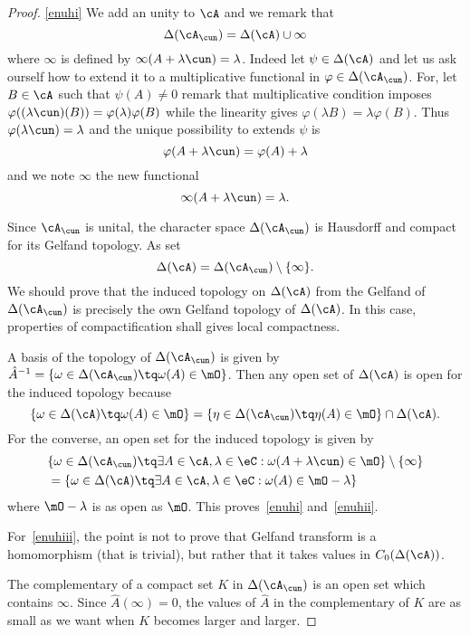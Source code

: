 \begin{proof}
\ref{enuhi} We add an unity to $\cA$ and we remark that
\[
\Delta(\cA_{\cun})=\Delta(\cA)\cup\infty
\]
where $\infty$ is defined by $\infty(A+\lambda\cun)=\lambda$. Indeed let $\psi\in\Delta(\cA)$ and let us ask ourself how to extend it to a multiplicative functional in $\varphi\in\Delta(\cA_{\cun})$. For, let $B\in\cA$ such that $\psi(A)\neq 0$ remark that multiplicative condition imposes $\varphi( (\lambda\cun)(B) )=\varphi(\lambda)\varphi(B)$ while the linearity gives $\varphi(\lambda B)=\lambda\varphi(B)$. Thus $\varphi(\lambda\cun)=\lambda$ and the unique possibility to extends $\psi$ is
\[
\varphi(A+\lambda\cun)=\varphi(A)+\lambda
\]
and we note $\infty$ the new functional
\[
\infty(A+\lambda\cun)=\lambda.
\]

Since $\cA_{\cun}$ is unital, the character space $\Delta(\cA_{\cun})$  is Hausdorff and compact for its Gelfand topology. As set
\[
  \Delta(\cA)=\Delta(\cA_{\cun})\setminus\{\infty\}.
\]
We should prove that the induced topology on $\Delta(\cA)$ from the Gelfand of $\Delta(\cA_{\cun})$ is precisely the own Gelfand topology of $\Delta(\cA)$. In this case, properties of compactification shall gives local compactness.

A basis of the topology of $\Delta(\cA_{\cun})$ is given by $\hat A^{-1}=\{\omega\in\Delta(\cA_{\cun})\tq\omega(A)\in\mO\}$. Then any open set of $\Delta(\cA)$ is open for the induced topology because
\[
\{\omega\in\Delta(\cA)\tq\omega(A)\in\mO\}=\{\eta\in\Delta(\cA_{\cun})\tq\eta(A)\in\mO\}\cap\Delta(\cA).
\]
For the converse, an open set for the induced topology is given by
\[
\begin{split}
&\{\omega\in\Delta(\cA_{\cun})\tq\exists A\in\cA,\lambda\in\eC:\omega(A+\lambda\cun)\in\mO\}\setminus\{\infty\}\\
&=\{\omega\in\Delta(\cA)\tq\exists A\in\cA,\lambda\in\eC:\omega(A)\in\mO-\lambda\}
\end{split}
\]
where $\mO-\lambda$ is as open as $\mO$. This proves~\ref{enuhi} and~\ref{enuhii}.

For~\ref{enuhiii}, the point is not to prove that Gelfand transform is a homomorphism (that is trivial), but rather that it takes values in $C_0(\Delta(\cA))$.

The complementary of a compact set $K$ in $\Delta(\cA_{\cun})$ is an open set which contains $\infty$. Since $\hat A(\infty)=0$, the values of $\hat A$ in the complementary of $K$ are as small as we want when $K$ becomes larger and larger.


\end{proof}
